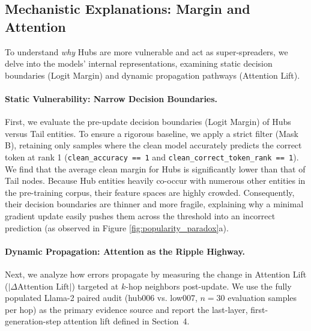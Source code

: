 \subsection{Mechanistic Explanations: Margin and Attention}
\label{subsec:mechanisms}

To understand \textit{why} Hubs are more vulnerable and act as super-spreaders, we delve into the models' internal representations, examining static decision boundaries (Logit Margin) and dynamic propagation pathways (Attention Lift).

\paragraph{Static Vulnerability: Narrow Decision Boundaries.}
First, we evaluate the pre-update decision boundaries (Logit Margin) of Hubs versus Tail entities. To ensure a rigorous baseline, we apply a strict filter (Mask B), retaining only samples where the clean model accurately predicts the correct token at rank 1 (\texttt{clean\_accuracy == 1} and \texttt{clean\_correct\_token\_rank == 1}). We find that the average clean margin for Hubs is significantly lower than that of Tail nodes. Because Hub entities heavily co-occur with numerous other entities in the pre-training corpus, their feature spaces are highly crowded. Consequently, their decision boundaries are thinner and more fragile, explaining why a minimal gradient update easily pushes them across the threshold into an incorrect prediction (as observed in Figure \ref{fig:popularity_paradox}a).

\paragraph{Dynamic Propagation: Attention as the Ripple Highway.}
Next, we analyze how errors propagate by measuring the change in Attention Lift ($|\Delta \text{Attention Lift}|$) targeted at $k$-hop neighbors post-update. We use the fully populated Llama-2 paired audit (hub006 vs. low007, $n=30$ evaluation samples per hop) as the primary evidence source and report the last-layer, first-generation-step attention lift defined in Section~4.




